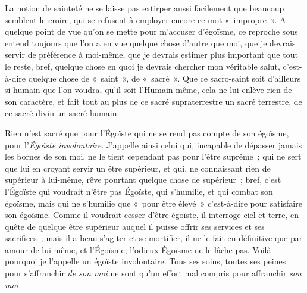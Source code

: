 \documentclass[french,twoside]{book} %
\begin{document}
La notion de sainteté ne se laisse pas extirper aussi facilement que beaucoup semblent le croire, qui se refusent à employer encore ce mot « impropre ». A quelque point de vue qu’on se mette pour m’accuser d’égoïsme, ce reproche sous entend toujours que l’on a en vue quelque chose d’autre que moi, que je devrais servir de préférence à moi-même, que je devrais estimer plus important que tout le reste, bref, quelque chose en quoi je devrais chercher mon véritable salut, c’est-à-dire quelque chose de « saint », de « sacré ». Que ce sacro-saint soit d’ailleurs si humain que l’on voudra, qu’il soit l’Humain même, cela ne lui enlève rien de son caractère, et fait tout au plus de ce sacré supraterrestre un sacré terrestre, de ce sacré divin un sacré humain.\par
Rien n’est sacré que pour l’Égoïste qui ne se rend pas compte de son égoïsme, pour l’\emph{Égoïste involontaire}. J’appelle ainsi celui qui, incapable de dépasser jamais les bornes de son moi, ne le tient cependant pas pour l’être suprême ; qui ne sert que lui en croyant servir un être supérieur, et qui, ne connaissant rien de supérieur à lui-même, rêve pourtant quelque chose de supérieur ; bref, c’est l’Égoïste qui voudrait n’être pas Égoïste, qui s’humilie, et qui combat son égoïsme, mais qui ne s’humilie que « pour être élevé » c’est-à-dire pour satisfaire son égoïsme. Comme il voudrait cesser d’être égoïste, il interroge ciel et terre, en quête de quelque être supérieur auquel il puisse offrir ses services et ses sacrifices ; mais il a beau s’agiter et se mortifier, il ne le fait en définitive que par amour de lui-même, et l’Égoïsme, l’odieux Égoïsme ne le lâche pas. Voilà pourquoi je l’appelle un égoïste involontaire. Tous ses soins, toutes ses peines pour s’affranchir \emph{de son moi} ne sont qu’un effort mal compris pour affranchir \emph{son moi.}\par
\end{document}
